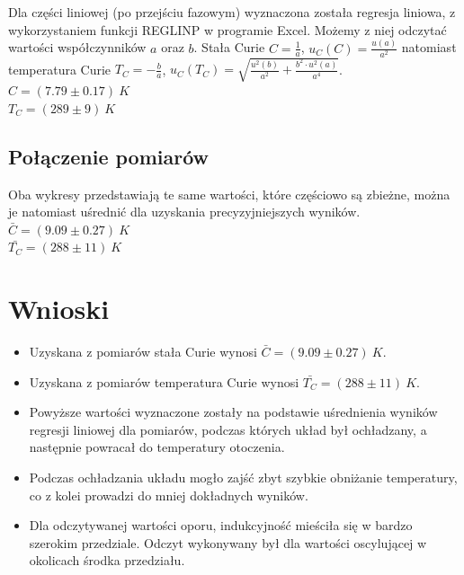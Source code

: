 \documentclass[12pt, a4paper, oneside]{article}
\begin{document}
\indent	Dla części liniowej (po przejściu fazowym) wyznaczona została regresja liniowa, z wykorzystaniem funkcji REGLINP w programie Excel. Możemy z niej odczytać wartości współczynników $a$ oraz $b$. Stała Curie $C=\frac{1}{a}$, $u_C(C)=\frac{u(a)}{a^2}$ natomiast temperatura Curie $T_C=-\frac{b}{a}$, $u_C(T_C)=\sqrt{\frac{u^2(b)}{a^2}+\frac{b^2\cdot u^2(a)}{a^4}}$.\\

\noindent$C=(7.79 \pm 0.17)~K$\\
$T_C=(289\pm9)~K$
\subsection{Połączenie pomiarów}
Oba wykresy przedstawiają te same wartości, które częściowo są zbieżne, można je natomiast uśrednić dla uzyskania precyzyjniejszych wyników.\\

\noindent$\bar{C}=(9.09\pm0.27)~K$\\
$\bar{T_C}=(288\pm11)~K$
\clearpage
\section{Wnioski}
\begin{itemize}
\item Uzyskana z pomiarów stała Curie wynosi $\bar{C}=(9.09\pm0.27)~K$.
\item Uzyskana z pomiarów temperatura Curie wynosi $\bar{T_C}=(288\pm11)~K$.
\item Powyższe wartości wyznaczone zostały na podstawie uśrednienia wyników regresji liniowej dla pomiarów, podczas których układ był ochładzany, a następnie powracał do temperatury otoczenia.
\item Podczas ochładzania układu mogło zajść zbyt szybkie obniżanie temperatury, co z kolei prowadzi do mniej dokładnych wyników.
\item Dla odczytywanej wartości oporu, indukcyjność mieściła się w bardzo szerokim przedziale. Odczyt wykonywany był dla wartości oscylującej w okolicach środka przedziału.
\end{itemize}
\end{document}
